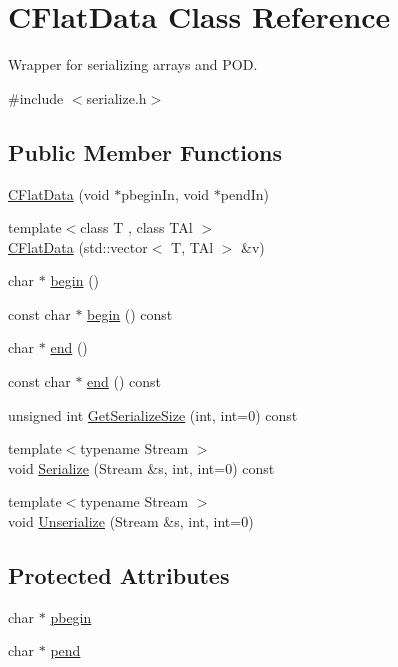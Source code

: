 \hypertarget{class_c_flat_data}{}\section{C\+Flat\+Data Class Reference}
\label{class_c_flat_data}


Wrapper for serializing arrays and P\+O\+D.  




{\ttfamily \#include $<$serialize.\+h$>$}

\subsection*{Public Member Functions}
\begin{DoxyCompactItemize}
\item 
\hyperlink{class_c_flat_data_afd4036c45c69e6b080f57d793e1bdf57}{C\+Flat\+Data} (void $\ast$pbegin\+In, void $\ast$pend\+In)
\item 
{\footnotesize template$<$class T , class T\+Al $>$ }\\\hyperlink{class_c_flat_data_aa536a3fe59b6cde08cf7ed57ecebedfb}{C\+Flat\+Data} (std\+::vector$<$ T, T\+Al $>$ \&v)
\item 
char $\ast$ \hyperlink{class_c_flat_data_ac8131cc3aec84905d7786fb19ff8953d}{begin} ()
\item 
const char $\ast$ \hyperlink{class_c_flat_data_abf086875237d322ea9aa4f3e6ac371e4}{begin} () const 
\item 
char $\ast$ \hyperlink{class_c_flat_data_ae88ae9f4121ff18aa8e29a3a40d7ee67}{end} ()
\item 
const char $\ast$ \hyperlink{class_c_flat_data_a3619008f211e2f02873cf37e597b64af}{end} () const 
\item 
unsigned int \hyperlink{class_c_flat_data_a9205cfe1bca792dd8605ed8cf4f2d7b7}{Get\+Serialize\+Size} (int, int=0) const 
\item 
{\footnotesize template$<$typename Stream $>$ }\\void \hyperlink{class_c_flat_data_a99e4a9e9c2c68ea484a102b8f08a7c5a}{Serialize} (Stream \&s, int, int=0) const 
\item 
{\footnotesize template$<$typename Stream $>$ }\\void \hyperlink{class_c_flat_data_a3da79327bf2937113de502182ee227b9}{Unserialize} (Stream \&s, int, int=0)
\end{DoxyCompactItemize}
\subsection*{Protected Attributes}
\begin{DoxyCompactItemize}
\item 
char $\ast$ \hyperlink{class_c_flat_data_ad5f93a9d4e1cc71eb5fc94e9c9d4d89d}{pbegin}
\item 
char $\ast$ \hyperlink{class_c_flat_data_add53aa6440254a30392bcf660f3f8057}{pend}
\end{DoxyCompactItemize}



